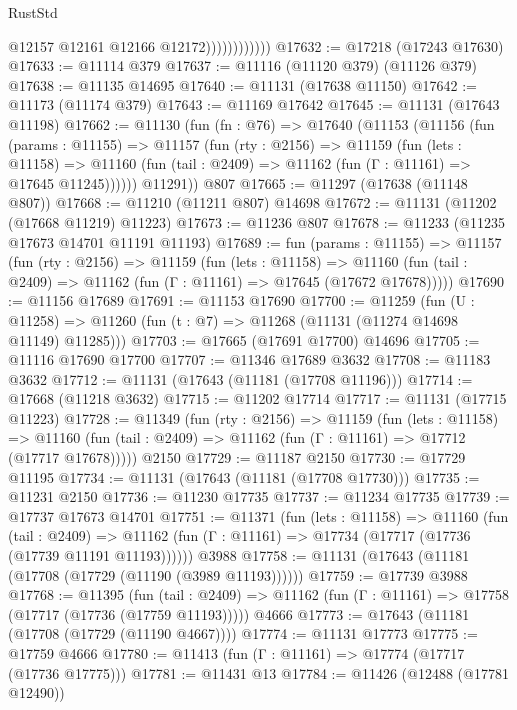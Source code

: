 \begin{lexlean}{RustStd}
\begin{coremodule}
                            @12157
                            @12161
                            @12166
                            @12172))))))))))))
@17632 := @17218 (@17243 @17630)
@17633 := @11114 @379
@17637 := @11116 (@11120 @379) (@11126 @379)
@17638 := @11135 @14695
@17640 := @11131 (@17638 @11150)
@17642 := @11173 (@11174 @379)
@17643 := @11169 @17642
@17645 := @11131 (@17643 @11198)
@17662 := @11130
    (fun (fn : @76) =>
    @17640
      (@11153
        (@11156
          (fun (params : @11155) =>
          @11157
            (fun (rty : @2156) =>
            @11159
              (fun (lets : @11158) =>
              @11160 (fun (tail : @2409) => @11162 (fun (Γ : @11161) => @17645 @11245))))))
        @11291))
    @807
@17665 := @11297 (@17638 (@11148 @807))
@17668 := @11210 (@11211 @807) @14698
@17672 := @11131 (@11202 (@17668 @11219) @11223)
@17673 := @11236 @807
@17678 := @11233 (@11235 @17673 @14701 @11191 @11193)
@17689 := fun (params : @11155) =>
  @11157
    (fun (rty : @2156) =>
    @11159
      (fun (lets : @11158) =>
      @11160 (fun (tail : @2409) => @11162 (fun (Γ : @11161) => @17645 (@17672 @17678)))))
@17690 := @11156 @17689
@17691 := @11153 @17690
@17700 := @11259
    (fun (U : @11258) => @11260 (fun (t : @7) => @11268 (@11131 (@11274 @14698 @11149) @11285)))
@17703 := @17665 (@17691 @17700) @14696
@17705 := @11116 @17690 @17700
@17707 := @11346 @17689 @3632
@17708 := @11183 @3632
@17712 := @11131 (@17643 (@11181 (@17708 @11196)))
@17714 := @17668 (@11218 @3632)
@17715 := @11202 @17714
@17717 := @11131 (@17715 @11223)
@17728 := @11349
    (fun (rty : @2156) =>
    @11159
      (fun (lets : @11158) =>
      @11160 (fun (tail : @2409) => @11162 (fun (Γ : @11161) => @17712 (@17717 @17678)))))
    @2150
@17729 := @11187 @2150
@17730 := @17729 @11195
@17734 := @11131 (@17643 (@11181 (@17708 @17730)))
@17735 := @11231 @2150
@17736 := @11230 @17735
@17737 := @11234 @17735
@17739 := @17737 @17673 @14701
@17751 := @11371
    (fun (lets : @11158) =>
    @11160
      (fun (tail : @2409) =>
      @11162 (fun (Γ : @11161) => @17734 (@17717 (@17736 (@17739 @11191 @11193))))))
    @3988
@17758 := @11131 (@17643 (@11181 (@17708 (@17729 (@11190 (@3989 @11193))))))
@17759 := @17739 @3988
@17768 := @11395
    (fun (tail : @2409) => @11162 (fun (Γ : @11161) => @17758 (@17717 (@17736 (@17759 @11193)))))
    @4666
@17773 := @17643 (@11181 (@17708 (@17729 (@11190 @4667))))
@17774 := @11131 @17773
@17775 := @17759 @4666
@17780 := @11413 (fun (Γ : @11161) => @17774 (@17717 (@17736 @17775)))
@17781 := @11431 @13
@17784 := @11426 (@12488 (@17781 @12490))

\end{coremodule}
\end{lexlean}
